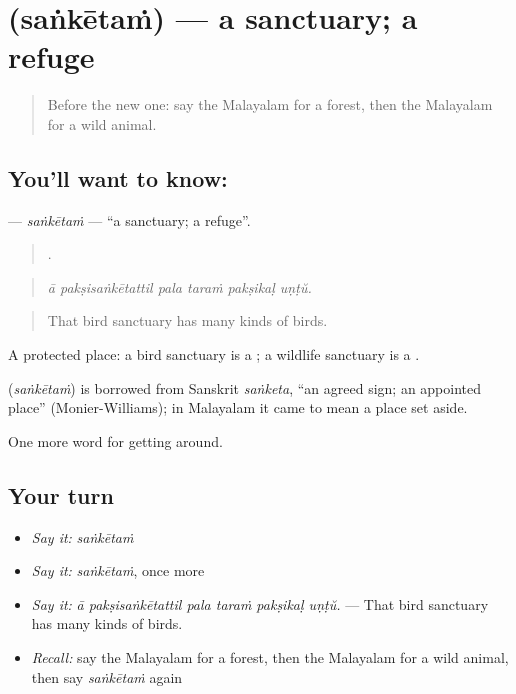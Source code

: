 \section[\texorpdfstring{\ml{സങ്കേതം} (saṅkētaṁ)}{സങ്കേതം (saṅkētaṁ)}]{ (saṅkētaṁ) — a sanctuary; a refuge}

\label{lesson:ML-C499-sanketam}



\begin{quote}
Before the new one: say the Malayalam for a forest, then the Malayalam for a wild animal.
\end{quote}

\subsection*{You'll want to know: }
\textbf{} — \emph{saṅkētaṁ} — \textquotedblleft{}a sanctuary; a refuge\textquotedblright{}.

\begin{quote}
     .
\end{quote}

\begin{quote}
\emph{ā pakṣisaṅkētattil pala taraṁ pakṣikaḷ uṇṭŭ.}
\end{quote}

\begin{quote}
That bird sanctuary has many kinds of birds.
\end{quote}

A protected place: a bird sanctuary is a ; a wildlife sanctuary is a .

\begin{cousinweb}
\textbf{} (\emph{saṅkētaṁ}) is borrowed from Sanskrit \emph{saṅketa}, \textquotedblleft{}an agreed sign; an appointed place\textquotedblright{} (Monier-Williams); in Malayalam it came to mean a place set aside.
\end{cousinweb}

\begin{grammarlens}[title={What you've built}]
One more word for getting around.
\end{grammarlens}

\subsection*{Your turn}
\begin{itemize}
\raggedright
  \item \emph{Say it:} \emph{saṅkētaṁ}
  \item \emph{Say it:} \emph{saṅkētaṁ}, once more
  \item \emph{Say it:} \emph{ā pakṣisaṅkētattil pala taraṁ pakṣikaḷ uṇṭŭ.} — That bird sanctuary has many kinds of birds.
  \item \emph{Recall:} say the Malayalam for a forest, then the Malayalam for a wild animal, then say \emph{saṅkētaṁ} again
\end{itemize}

